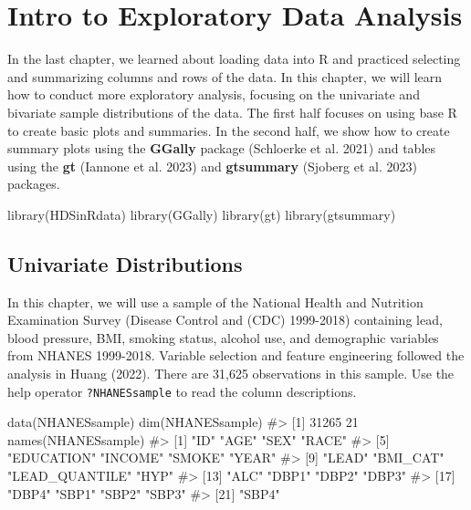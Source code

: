 \documentclass[
  letterpaper,
]{krantz}
\makeatletter
\newenvironment{Shaded}{\begin{snugshade}}{\end{snugshade}}
\newcommand{\CommentTok}[1]{\textcolor[rgb]{0.37,0.37,0.37}{#1}}
\newcommand{\FunctionTok}[1]{\textcolor[rgb]{0.28,0.35,0.67}{#1}}
\newcommand{\NormalTok}[1]{\textcolor[rgb]{0.00,0.23,0.31}{#1}}
\newenvironment{kframe}{%
\medskip{}
\setlength{\fboxsep}{.8em}
 \def\at@end@of@kframe{}%
 \ifinner\ifhmode%
  \def\at@end@of@kframe{\end{minipage}}%
  \begin{minipage}{\columnwidth}%
 \fi\fi%
 \def\FrameCommand##1{\hskip\@totalleftmargin \hskip-\fboxsep
 \colorbox{shadecolor}{##1}\hskip-\fboxsep
     \hskip-\linewidth \hskip-\@totalleftmargin \hskip\columnwidth}%
 \MakeFramed {\advance\hsize-\width
   \@totalleftmargin\z@ \linewidth\hsize
   \@setminipage}}%
 {\par\unskip\endMakeFramed%
 \at@end@of@kframe}
\renewenvironment{Shaded}{\begin{kframe}}{\end{kframe}}
\makeatother
\begin{document}

\hypertarget{sec-exploratory}{%
\chapter{Intro to Exploratory Data Analysis}\label{sec-exploratory}}

In the last chapter, we learned about loading data into R and practiced
selecting and summarizing columns and rows of the data. In this chapter,
we will learn how to conduct more exploratory analysis, focusing on the
univariate and bivariate sample distributions of the data. The first
half focuses on using base R to create basic plots and summaries. In the
second half, we show how to create summary plots using the
\textbf{GGally} package (Schloerke et al. 2021) and tables using the
\textbf{gt} (Iannone et al. 2023) and \textbf{gtsummary} (Sjoberg et al.
2023) packages.

\begin{Shaded}
\begin{Highlighting}[]
\FunctionTok{library}\NormalTok{(HDSinRdata)}
\FunctionTok{library}\NormalTok{(GGally) }
\FunctionTok{library}\NormalTok{(gt)}
\FunctionTok{library}\NormalTok{(gtsummary)}
\end{Highlighting}
\end{Shaded}

\hypertarget{univariate-distributions}{%
\section{Univariate Distributions}\label{univariate-distributions}}

In this chapter, we will use a sample of the National Health and
Nutrition Examination Survey (Disease Control and (CDC) 1999-2018)
containing lead, blood pressure, BMI, smoking status, alcohol use, and
demographic variables from NHANES 1999-2018. Variable selection and
feature engineering followed the analysis in Huang (2022). There are
31,625 observations in this sample. Use the help operator
\texttt{?NHANESsample} to read the column descriptions.

\begin{Shaded}
\begin{Highlighting}[]
\FunctionTok{data}\NormalTok{(NHANESsample)}
\FunctionTok{dim}\NormalTok{(NHANESsample)}
\CommentTok{\#\textgreater{} [1] 31265    21}
\FunctionTok{names}\NormalTok{(NHANESsample)}
\CommentTok{\#\textgreater{}  [1] "ID"            "AGE"           "SEX"           "RACE"         }
\CommentTok{\#\textgreater{}  [5] "EDUCATION"     "INCOME"        "SMOKE"         "YEAR"         }
\CommentTok{\#\textgreater{}  [9] "LEAD"          "BMI\_CAT"       "LEAD\_QUANTILE" "HYP"          }
\CommentTok{\#\textgreater{} [13] "ALC"           "DBP1"          "DBP2"          "DBP3"         }
\CommentTok{\#\textgreater{} [17] "DBP4"          "SBP1"          "SBP2"          "SBP3"         }
\CommentTok{\#\textgreater{} [21] "SBP4"}
\end{Highlighting}
\end{Shaded}
\end{document}
